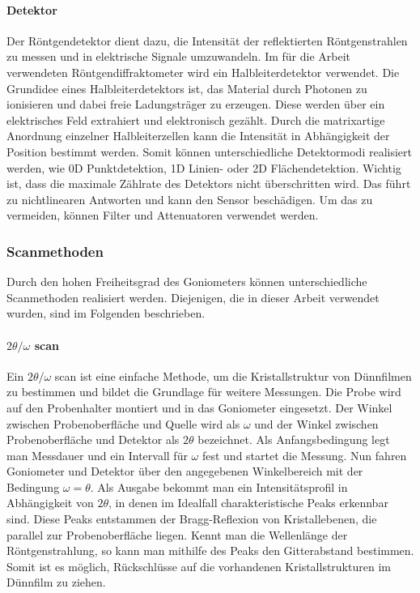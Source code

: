 \paragraph{Detektor}
Der Röntgendetektor dient dazu, die Intensität der reflektierten Röntgenstrahlen zu messen und
in elektrische Signale umzuwandeln.
Im für die Arbeit verwendeten Röntgendiffraktometer wird ein Halbleiterdetektor verwendet.
Die Grundidee eines Halbleiterdetektors ist, das Material durch Photonen zu ionisieren und dabei freie Ladungsträger zu
erzeugen.
Diese werden über ein elektrisches Feld extrahiert und elektronisch gezählt.
Durch die matrixartige Anordnung einzelner Halbleiterzellen kann die Intensität in Abhängigkeit der Position bestimmt
werden.
Somit können unterschiedliche Detektormodi realisiert werden, wie 0D Punktdetektion,
1D Linien- oder 2D Flächendetektion.
Wichtig ist, dass die maximale Zählrate des Detektors nicht überschritten wird.
Das führt zu nichtlinearen Antworten und kann den Sensor beschädigen.
Um das zu vermeiden, können Filter und Attenuatoren verwendet werden.

\subsubsection{Scanmethoden}
Durch den hohen Freiheitsgrad des Goniometers können unterschiedliche Scanmethoden realisiert werden.
Diejenigen, die in dieser Arbeit verwendet wurden, sind im Folgenden beschrieben.

\paragraph{$2\theta/\omega$ scan}
Ein $2\theta/\omega$ scan ist eine einfache Methode, um die Kristallstruktur von Dünnfilmen zu bestimmen
und bildet die Grundlage für weitere Messungen.
Die Probe wird auf den Probenhalter montiert und in das Goniometer eingesetzt.
Der Winkel zwischen Probenoberfläche und Quelle wird als $\omega$ und der Winkel zwischen Probenoberfläche und Detektor
als $2\theta$ bezeichnet.
Als Anfangsbedingung legt man Messdauer und ein Intervall für $\omega$ fest und startet die Messung.
Nun fahren Goniometer und Detektor über den angegebenen Winkelbereich mit der Bedingung $\omega = \theta$.
Als Ausgabe bekommt man ein Intensitätsprofil in Abhängigkeit von $2\theta$, in denen im Idealfall charakteristische
Peaks erkennbar sind.
Diese Peaks entstammen der Bragg-Reflexion von Kristallebenen, die parallel zur Probenoberfläche liegen.
Kennt man die Wellenlänge der Röntgenstrahlung, so kann man mithilfe des Peaks den Gitterabstand bestimmen.
Somit ist es möglich, Rückschlüsse auf die vorhandenen Kristallstrukturen im Dünnfilm zu ziehen.

